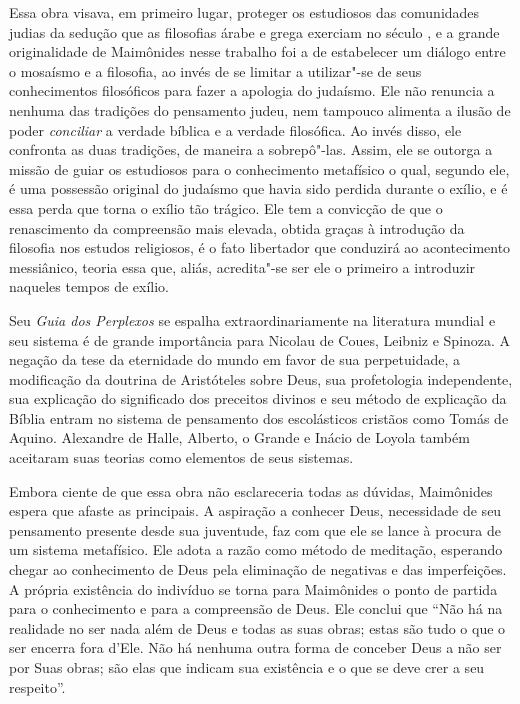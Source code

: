 Essa obra visava, em primeiro lugar, proteger os estudiosos das
comunidades judias da sedução que as filosofias árabe e grega exerciam
no século , e a grande originalidade de Maimônides nesse trabalho foi
a de estabelecer um diálogo entre o mosaísmo e a filosofia, ao invés de
se limitar a utilizar"-se de seus conhecimentos filosóficos para fazer a
apologia do judaísmo. Ele não renuncia a nenhuma das tradições do
pensamento judeu, nem tampouco alimenta a ilusão de poder \emph{conciliar}
a verdade bíblica e a verdade filosófica. Ao invés disso, ele confronta
as duas tradições, de maneira a sobrepô"-las. Assim, ele se outorga a
missão de guiar os estudiosos para o conhecimento metafísico o qual,
segundo ele, é uma possessão original do judaísmo que havia sido perdida
durante o exílio, e é essa perda que torna o exílio tão trágico. Ele tem
a convicção de que o renascimento da compreensão mais elevada, obtida
graças à introdução da filosofia nos estudos religiosos, é o fato
libertador que conduzirá ao acontecimento messiânico, teoria essa que,
aliás, acredita"-se ser ele o primeiro a introduzir naqueles tempos de
exílio.

Seu \emph{Guia dos Perplexos} se espalha extraordinariamente na
literatura mundial e seu sistema é de grande importância para Nicolau de
Coues, Leibniz e Spinoza. A negação da tese da eternidade do mundo em
favor de sua perpetuidade, a modificação da doutrina de Aristóteles
sobre Deus, sua profetologia independente, sua explicação do significado
dos preceitos divinos e seu método de explicação da Bíblia entram no
sistema de pensamento dos escolásticos cristãos como Tomás de Aquino.
Alexandre de Halle, Alberto, o Grande e Inácio de Loyola também
aceitaram suas teorias como elementos de seus sistemas.

Embora ciente de que essa obra não esclareceria todas as dúvidas,
Maimônides espera que afaste as principais. A aspiração a conhecer
Deus, necessidade de seu pensamento presente desde sua juventude, faz
com que ele se lance à procura de um sistema metafísico. Ele adota a
razão como método de meditação, esperando chegar ao conhecimento de Deus
pela eliminação de negativas e das imperfeições. A própria existência do
indivíduo se torna para Maimônides o ponto de partida para o
conhecimento e para a compreensão de Deus. Ele conclui que ``Não há na
realidade no ser nada além de Deus e todas as suas obras; estas são
tudo o que o ser encerra fora d'Ele. Não há nenhuma outra forma de
conceber Deus a não ser por Suas obras; são elas que indicam sua
existência e o que se deve crer a seu respeito''.


